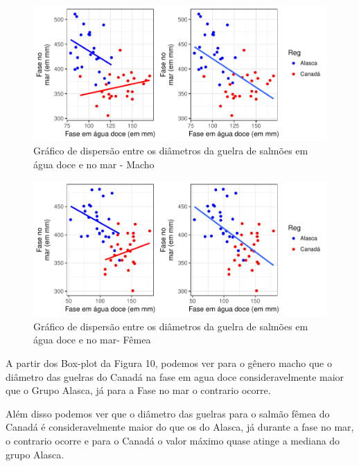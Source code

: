 \documentclass[10pt,portuguese,]{article}
\begin{document}
\begin{figure}[!h]

{\centering \includegraphics{RELATORIO_FINAL_FORMATADO_files/figure-latex/unnamed-chunk-31-1} 

}

\caption{ Gráfico de dispersão entre os diâmetros da guelra de salmões em água doce e no mar - Macho}\label{fig:unnamed-chunk-31}
\end{figure}

\vspace{0.5cm}

\begin{figure}[!h]

{\centering \includegraphics{RELATORIO_FINAL_FORMATADO_files/figure-latex/unnamed-chunk-32-1} 

}

\caption{Gráfico de dispersão entre os diâmetros da guelra de salmões em água doce e no mar- Fêmea}\label{fig:unnamed-chunk-32}
\end{figure}

A partir dos Box-plot da Figura 10, podemos ver para o gênero macho que
o diâmetro das guelras do Canadá na fase em agua doce consideravelmente
maior que o Grupo Alasca, já para a Fase no mar o contrario ocorre.

Além disso podemos ver que o diâmetro das guelras para o salmão fêmea do
Canadá é consideravelmente maior do que os do Alasca, já durante a fase
no mar, o contrario ocorre e para o Canadá o valor máximo quase atinge a
mediana do grupo Alasca.
\end{document}
